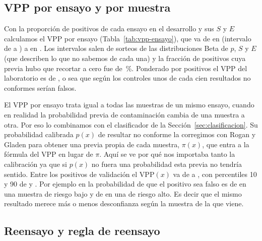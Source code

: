 \subsection{VPP por ensayo y por muestra}

Con la proporción de positivos de cada ensayo en el desarrollo y sus $S$ y $E$
calculamos el VPP por ensayo (Tabla~\ref{tab:vpp-ensayo}), que va de
\ClfVPPPeor{} en \ClfVPPPeorEnsayo{} (intervalo de \ClfVPPPeorInf{} a
\ClfVPPPeorSup{}) a \ClfVPPMejor{} en \textit{\ClfVPPMejorEnsayo}. Los
intervalos salen de \ClfSorteos{} sorteos de las distribuciones Beta de $p$,
$S$ y $E$ (que describen lo que no sabemos de cada una) y la fracción de
positivos cuya previa hubo que recortar a cero fue de
\ClfRecorteCeroPct{}\,\%. Ponderado por positivos el VPP del laboratorio es
de \ClfVPPGlobal{}, o sea que según los controles unos \ClfFalsosPorCien{} de
cada cien resultados no conformes serían falsos.

\begin{table}[!htbp]
\centering
{}
\caption{VPP por ensayo en el desarrollo, con la prevalencia corregida por
Rogan y Gladen: Los ensayos con pocos positivos (\textit{Salmonella} y
esterilidad) son los de intervalos más anchos.}
\label{tab:vpp-ensayo}
\end{table}

El VPP por ensayo trata igual a todas las muestras de un mismo ensayo, cuando
en realidad la probabilidad previa de contaminación cambia de una muestra a
otra. Por eso lo combinamos con el clasificador de la
Sección~\ref{sec:clasificacion}. Su probabilidad calibrada $p(x)$ de resultar
no conforme la corregimos con Rogan y Gladen para obtener una previa propia de
cada muestra, $\pi(x)$, que entra a la fórmula del VPP en lugar de $\pi$. Aquí
se ve por qué nos importaba tanto la calibración ya que si $p(x)$ no fuera
una probabilidad esta previa no tendría sentido. Entre los
\ClfPositivosValidacionBayes{} positivos de validación el VPP$(x)$ va de
\ClfVPPxMin{} a \ClfVPPxMax{}, con percentiles 10 y 90 de \ClfVPPxPDiez{} y
\ClfVPPxPNoventa{}. Por ejemplo en \ClfEnsayoEjemplo{} la probabilidad de que
el positivo sea falso es de \ClfFalsoRiesgoBajo{} en una muestra de riesgo
bajo y de \ClfFalsoRiesgoAlto{} en una de riesgo alto. Es decir que el mismo
resultado merece más o menos desconfianza según la muestra de la que viene.

\subsection{Reensayo y regla de reensayo}

